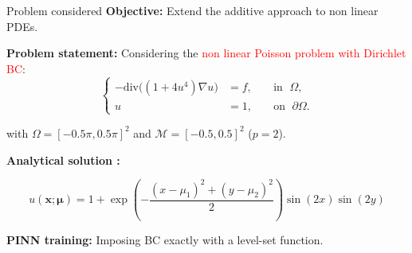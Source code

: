 \begin{frame}{Problem considered}	
    \textbf{Objective:} Extend the additive approach to non linear PDEs.

    \vspace{10pt}
    \textbf{Problem statement:} Considering the \textcolor{red}{non linear Poisson problem with Dirichlet BC}:
    \vspace{-5pt}
    \begin{equation*}
        \left\{
        \begin{aligned}
            -\text{div}\big((1+4u^4)\nabla u\big) & = f, \; &  & \text{in } \; \Omega, \\
            u         & = 1, \;  &  & \text{on } \; \partial\Omega.
        \end{aligned}
        \right.
    \end{equation*}

    with $\Omega=[-0.5\pi,0.5\pi]^2$ and $\mathcal{M}=[-0.5,0.5]^2$ ($p=2$).

    \vspace{5pt}
	\textbf{Analytical solution :}

	\vspace{-12pt}
	\begin{equation*}
		u(\bm{x};\bm{\mu})= 1 + \exp\left(-\frac{(x-\mu_1)^2+(y-\mu_2)^2}{2}\right)\sin(2x)\sin(2y)
	\end{equation*}
	\vspace{-5pt}
	
    \vspace{5pt}
	\textbf{PINN training:} Imposing BC exactly with a level-set function.

\end{frame}

